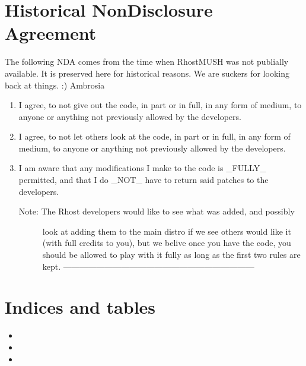 \documentclass[letterpaper,10pt,english]{sphinxmanual}
\begin{document}
\chapter{Historical Non\sphinxhyphen{}Disclosure Agreement}
\label{\detokenize{nda:historical-non-disclosure-agreement}}\label{\detokenize{nda::doc}}
\sphinxAtStartPar
The following NDA comes from the time when RhostMUSH was not publially
available. It is preserved here for historical reasons. We are suckers for
looking back at things. :)
\textendash{}Ambrosia
\begin{enumerate}
%
\item {} 
\sphinxAtStartPar
I agree, to not give out the code, in part or in full, in any form of
medium, to anyone or anything not previously allowed by the developers.

\item {} 
\sphinxAtStartPar
I agree, to not let others look at the code, in part or in full, in
any form of medium, to anyone or anything not previously allowed by the
developers.

\item {} 
\sphinxAtStartPar
I am aware that any modifications I make to the code is \_FULLY\_
permitted, and that I do \_NOT\_ have to return said patches to the
developers.
\begin{quote}
\end{quote}
\begin{description}
\item[{Note: The Rhost developers would like to see what was added, and possibly}] \leavevmode
\sphinxAtStartPar
look at adding them to the main distro if we see others would like
it (with full credits to you), but we belive once you have the code,
you should be allowed to play with it fully as long as the first two
rules are kept.
———————————————————————

\end{description}

\end{enumerate}


\chapter{Indices and tables}
\label{\detokenize{index:indices-and-tables}}\begin{itemize}
\item {} 
\sphinxAtStartPar
{}

\item {} 
\sphinxAtStartPar
{}

\item {} 
\sphinxAtStartPar
{}

\end{itemize}



\renewcommand{\indexname}{Index}
\printindex
\end{document}
